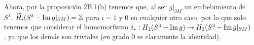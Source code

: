 \documentclass[twoside]{article}
\begin{document}
\begin{solucion}
\begin{enumerate}[(a)]
Ahora, por la proposición 2B.1(b) tenemos que, al ser $g|_{\partial M}$ un embebimiento de $S^1$, $\widetilde{H}_i(S^3-\operatorname{Im} g|_{\partial M})=\mathbb{Z}$ para $i=1$ y 0 en cualquier otro caso, por lo que solo tenemos que considerar el homomorfismo $i_*:H_1(S^3-\operatorname{Im} g)\to H_1(S^3-\operatorname{Im} g|_{\partial M})$, ya que los demás son triviales (en grado 0 es claramente la identidad). 
%
%

\end{enumerate}
\end{solucion}
\end{document}
